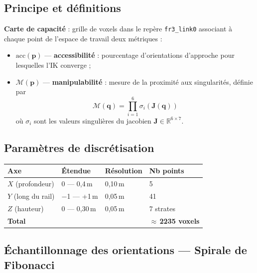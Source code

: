 \documentclass[11pt, a4paper]{article}
\newcommand{\manip}{\mathcal{M}}
\begin{document}
\subsection{Principe et définitions}

\begin{definitionbox}
\textbf{Carte de capacité} : grille de voxels dans le repère \texttt{fr3\_link0} associant à chaque point de l'espace de travail deux métriques :
\begin{itemize}
  \item $\mathrm{acc}(\mathbf{p})$ — \textbf{accessibilité} : pourcentage d'orientations d'approche pour lesquelles l'IK converge ;
  \item $\manip(\mathbf{p})$ — \textbf{manipulabilité} : mesure de la proximité aux singularités, définie par
  \begin{equation}
    \manip(\mathbf{q}) = \prod_{i=1}^{6} \sigma_i(\mathbf{J}(\mathbf{q}))
    \label{eq:manip}
  \end{equation}
  où $\sigma_i$ sont les valeurs singulières du jacobien $\mathbf{J} \in \mathbb{R}^{6\times 7}$.
\end{itemize}
\end{definitionbox}

\subsection{Paramètres de discrétisation}

\begin{center}
\begin{tabular}{llll}
  \toprule
  \rowcolor{LightBlue}
  \textbf{Axe} & \textbf{Étendue} & \textbf{Résolution} & \textbf{Nb points} \\
  \midrule
  $X$ (profondeur)    & 0 — 0,4\,m  & 0,10\,m & 5  \\
  $Y$ (long du rail)  & −1 — +1\,m  & 0,05\,m & 41 \\
  $Z$ (hauteur)       & 0 — 0,30\,m & 0,05\,m & 7 strates \\
  \midrule
  \textbf{Total} & & & \textbf{$\approx$\,2235 voxels} \\
  \bottomrule
\end{tabular}
\end{center}

\subsection{Échantillonnage des orientations — Spirale de Fibonacci}
\end{document}
